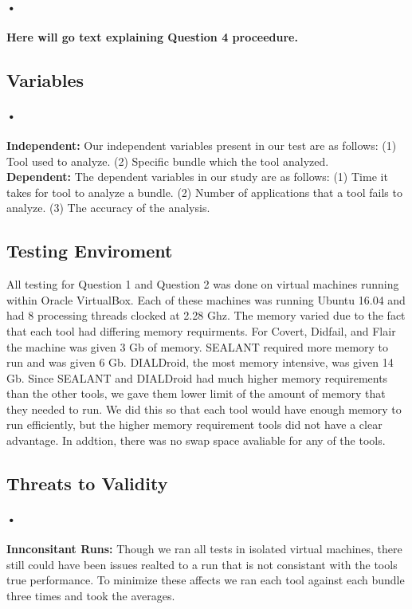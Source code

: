 \documentclass[twocolumn]{article}
\begin{document}
\paragraph{•}
	\textbf{Here will go text explaining Question 4 proceedure.}

\subsection{Variables}
\paragraph{•}
	\textbf{Independent:} Our independent variables present in our test are as follows: (1) Tool used to analyze. (2) Specific bundle which the tool analyzed.\\
	\textbf{Dependent:} The dependent variables in our study are as follows: (1) Time it takes for tool to analyze a bundle. (2) Number of applications that a tool fails to analyze. (3) The accuracy of the analysis.
	
\subsection{Testing Enviroment}
	All testing for Question 1 and Question 2 was done on virtual machines running within Oracle VirtualBox. Each of these machines was running Ubuntu 16.04 and had 8 processing threads clocked at 2.28 Ghz. The memory varied due to the fact that each tool had differing memory requirments. For Covert, Didfail, and Flair the machine was given 3 Gb of memory. SEALANT required more memory to run and was given 6 Gb. DIALDroid, the most memory intensive, was given 14 Gb. Since SEALANT and DIALDroid had much higher memory requirements than the other tools, we gave them lower limit of the amount of memory that they needed to run. We did this so that each tool would have enough memory to run efficiently, but the higher memory requirement tools did not have a clear advantage. In addtion, there was no swap space avaliable for any of the tools.
	
\subsection{Threats to Validity}
\paragraph{•}
	\textbf{Innconsitant Runs:} Though we ran all tests in isolated virtual machines, there still could have been issues realted to a run that is not consistant with the tools true performance. To minimize these affects we ran each tool against each bundle three times and took the averages.
\end{document}
